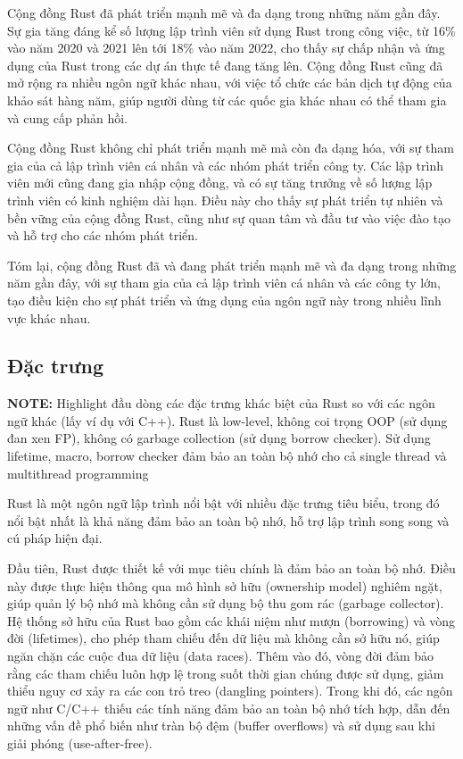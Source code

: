 Cộng đồng Rust đã phát triển mạnh mẽ và đa dạng trong những năm gần đây. Sự gia tăng đáng kể số lượng lập trình viên sử dụng Rust trong công việc, từ 16\% vào năm 2020 và 2021 lên tới 18\% vào năm 2022, cho thấy sự chấp nhận và ứng dụng của Rust trong các dự án thực tế đang tăng lên. Cộng đồng Rust cũng đã mở rộng ra nhiều ngôn ngữ khác nhau, với việc tổ chức các bản dịch tự động của khảo sát hàng năm, giúp người dùng từ các quốc gia khác nhau có thể tham gia và cung cấp phản hồi.

Cộng đồng Rust không chỉ phát triển mạnh mẽ mà còn đa dạng hóa, với sự tham gia của cả lập trình viên cá nhân và các nhóm phát triển công ty. Các lập trình viên mới cũng đang gia nhập cộng đồng, và có sự tăng trưởng về số lượng lập trình viên có kinh nghiệm dài hạn. Điều này cho thấy sự phát triển tự nhiên và bền vững của cộng đồng Rust, cũng như sự quan tâm và đầu tư vào việc đào tạo và hỗ trợ cho các nhóm phát triển.

Tóm lại, cộng đồng Rust đã và đang phát triển mạnh mẽ và đa dạng trong những năm gần đây, với sự tham gia của cả lập trình viên cá nhân và các công ty lớn, tạo điều kiện cho sự phát triển và ứng dụng của ngôn ngữ này trong nhiều lĩnh vực khác nhau.

\subsection{Đặc trưng}

\textbf{NOTE:} Highlight đầu dòng các đặc trưng khác biệt của Rust so với các ngôn ngữ khác (lấy ví dụ với C++). Rust là low-level, không coi trọng OOP (sử dụng đan xen FP), không có garbage collection (sử dụng borrow checker). Sử dụng lifetime, macro, borrow checker đảm bảo an toàn bộ nhớ cho cả single thread và multithread programming

Rust là một ngôn ngữ lập trình nổi bật với nhiều đặc trưng tiêu biểu, trong đó nổi bật nhất là khả năng đảm bảo an toàn bộ nhớ, hỗ trợ lập trình song song và cú pháp hiện đại.

Đầu tiên, Rust được thiết kế với mục tiêu chính là đảm bảo an toàn bộ nhớ. Điều này được thực hiện thông qua mô hình sở hữu (ownership model) nghiêm ngặt, giúp quản lý bộ nhớ mà không cần sử dụng bộ thu gom rác (garbage collector). Hệ thống sở hữu của Rust bao gồm các khái niệm như mượn (borrowing) và vòng đời (lifetimes), cho phép tham chiếu đến dữ liệu mà không cần sở hữu nó, giúp ngăn chặn các cuộc đua dữ liệu (data races). Thêm vào đó, vòng đời đảm bảo rằng các tham chiếu luôn hợp lệ trong suốt thời gian chúng được sử dụng, giảm thiểu nguy cơ xảy ra các con trỏ treo (dangling pointers). Trong khi đó, các ngôn ngữ như C/C++ thiếu các tính năng đảm bảo an toàn bộ nhớ tích hợp, dẫn đến những vấn đề phổ biến như tràn bộ đệm (buffer overflows) và sử dụng sau khi giải phóng (use-after-free).

